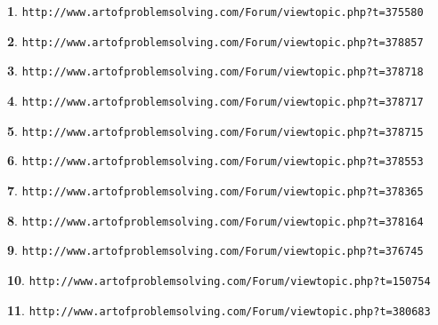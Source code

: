\documentclass{article}
\theoremstyle{definition}
\newtheorem{s}{}
\begin{document}
\begin{s}
\texttt{http://www.artofproblemsolving.com/Forum/viewtopic.php?t=375580}
\end{s}





\begin{s}
\texttt{http://www.artofproblemsolving.com/Forum/viewtopic.php?t=378857}
\end{s}


\begin{s}
\texttt{http://www.artofproblemsolving.com/Forum/viewtopic.php?t=378718}
\end{s}



\begin{s}
\texttt{http://www.artofproblemsolving.com/Forum/viewtopic.php?t=378717}
\end{s}


\begin{s}
\texttt{http://www.artofproblemsolving.com/Forum/viewtopic.php?t=378715}
\end{s}





\begin{s}
\texttt{http://www.artofproblemsolving.com/Forum/viewtopic.php?t=378553}
\end{s}


\begin{s}
\texttt{http://www.artofproblemsolving.com/Forum/viewtopic.php?t=378365}
\end{s}



\begin{s}
\texttt{http://www.artofproblemsolving.com/Forum/viewtopic.php?t=378164}
\end{s}


\begin{s}
\texttt{http://www.artofproblemsolving.com/Forum/viewtopic.php?t=376745}
\end{s}





\begin{s}
\texttt{http://www.artofproblemsolving.com/Forum/viewtopic.php?t=150754}
\end{s}


\begin{s}
\texttt{http://www.artofproblemsolving.com/Forum/viewtopic.php?t=380683}
\end{s}
\end{document}
